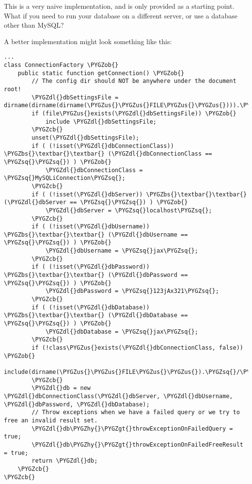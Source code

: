 \documentclass[letterpaper,10pt,english]{sphinxmanual}
\def\PYGZbs{\char`\\}
\def\PYGZus{\char`\_}
\def\PYGZob{\char`\{}
\def\PYGZcb{\char`\}}
\def\PYGZgt{\char`\>}
\def\PYGZdl{\char`\$}
\def\PYGZhy{\char`\-}
\def\PYGZsq{\char`\'}
\renewcommand\PYGZsq{\textquotesingle}
\begin{document}
This is a very naive implementation, and is only provided as a starting point.  What if you need to
run your database on a different server, or use a database other than MySQL?

A better implementation might look something like this:

\begin{Verbatim}[commandchars=\\\{\}]
...
class ConnectionFactory \PYGZob{}
    public static function getConnection() \PYGZob{}
        // The config dir should NOT be anywhere under the document root!
        \PYGZdl{}dbSettingsFile = dirname(dirname(dirname(\PYGZus{}\PYGZus{}FILE\PYGZus{}\PYGZus{}))).\PYGZsq{}/config/dbsettings.php\PYGZsq{};
        if (file\PYGZus{}exists(\PYGZdl{}dbSettingsFile)) \PYGZob{}
            include \PYGZdl{}dbSettingsFile;
        \PYGZcb{}
        unset(\PYGZdl{}dbSettingsFile);
        if ( (!isset(\PYGZdl{}dbConnectionClass)) \PYGZbs{}\textbar{}\textbar{} (\PYGZdl{}dbConnectionClass == \PYGZsq{}\PYGZsq{}) ) \PYGZob{}
            \PYGZdl{}dbConnectionClass = \PYGZsq{}MySQLiConnection\PYGZsq{};
        \PYGZcb{}
        if ( (!isset(\PYGZdl{}dbServer)) \PYGZbs{}\textbar{}\textbar{} (\PYGZdl{}dbServer == \PYGZsq{}\PYGZsq{}) ) \PYGZob{}
            \PYGZdl{}dbServer = \PYGZsq{}localhost\PYGZsq{};
        \PYGZcb{}
        if ( (!isset(\PYGZdl{}dbUsername)) \PYGZbs{}\textbar{}\textbar{} (\PYGZdl{}dbUsername == \PYGZsq{}\PYGZsq{}) ) \PYGZob{}
            \PYGZdl{}dbUsername = \PYGZsq{}jax\PYGZsq{};
        \PYGZcb{}
        if ( (!isset(\PYGZdl{}dbPassword)) \PYGZbs{}\textbar{}\textbar{} (\PYGZdl{}dbPassword == \PYGZsq{}\PYGZsq{}) ) \PYGZob{}
            \PYGZdl{}dbPassword = \PYGZsq{}123jAx321\PYGZsq{};
        \PYGZcb{}
        if ( (!isset(\PYGZdl{}dbDatabase)) \PYGZbs{}\textbar{}\textbar{} (\PYGZdl{}dbDatabase == \PYGZsq{}\PYGZsq{}) ) \PYGZob{}
            \PYGZdl{}dbDatabase = \PYGZsq{}jax\PYGZsq{};
        \PYGZcb{}
        if (!class\PYGZus{}exists(\PYGZdl{}dbConnectionClass, false)) \PYGZob{}
            include(dirname(\PYGZus{}\PYGZus{}FILE\PYGZus{}\PYGZus{}).\PYGZsq{}/\PYGZsq{}.\PYGZdl{}dbConnectionClass.\PYGZsq{}.class.php\PYGZsq{});
        \PYGZcb{}
        \PYGZdl{}db = new \PYGZdl{}dbConnectionClass(\PYGZdl{}dbServer, \PYGZdl{}dbUsername, \PYGZdl{}dbPassword, \PYGZdl{}dbDatabase);
        // Throw exceptions when we have a failed query or we try to free an invalid result set.
        \PYGZdl{}db\PYGZhy{}\PYGZgt{}throwExceptionOnFailedQuery = true;
        \PYGZdl{}db\PYGZhy{}\PYGZgt{}throwExceptionOnFailedFreeResult = true;
        return \PYGZdl{}db;
    \PYGZcb{}
\PYGZcb{}
\end{Verbatim}
\end{document}
